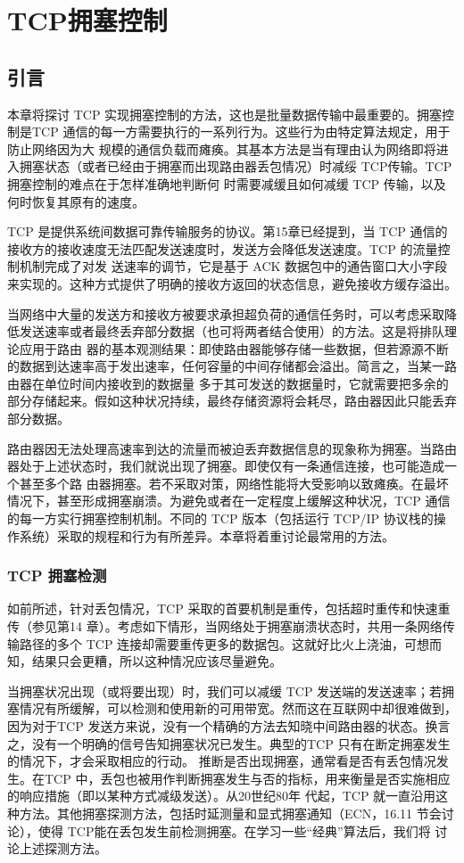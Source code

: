 \chapter{TCP拥塞控制}
\minitoc

\section{引言}
本章将探讨 TCP 实现拥塞控制的方法，这也是批量数据传输中最重要的。拥塞控制是TCP 通信的每一方需要执行的一系列行为。这些行为由特定算法规定，用于防止网络因为大
规模的通信负载而瘫痪。其基本方法是当有理由认为网络即将进入拥塞状态（或者已经由于拥塞而出现路由器丢包情况）时减绥 TCP传输。TCP 拥塞控制的难点在于怎样准确地判断何
时需要减缓且如何减缓 TCP 传输，以及何时恢复其原有的速度。

TCP 是提供系统间数据可靠传输服务的协议。第15章已经提到，当 TCP 通信的接收方的接收速度无法匹配发送速度时，发送方会降低发送速度。TCP 的流量控制机制完成了对发
送速率的调节，它是基于 ACK 数据包中的通告窗口大小字段来实现的。这种方式提供了明确的接收方返回的状态信息，避免接收方缓存溢出。

当网络中大量的发送方和接收方被要求承担超负荷的通信任务时，可以考虑采取降低发送速率或者最终丢弃部分数据（也可将两者结合使用）的方法。这是将排队理论应用于路由
器的基本观测结果：即使路由器能够存储一些数据，但若源源不断的数据到达速率高于发出速率，任何容量的中间存储都会溢出。简言之，当某一路由器在单位时间内接收到的数据量
多于其可发送的数据量时，它就需要把多余的部分存储起来。假如这种状况持续，最终存储资源将会耗尽，路由器因此只能丢弃部分数据。

路由器因无法处理高速率到达的流量而被迫丢弃数据信息的现象称为拥塞。当路由器处于上述状态时，我们就说出现了拥塞。即使仅有一条通信连接，也可能造成一个甚至多个路
由器拥塞。若不采取对策，网络性能将大受影响以致瘫痪。在最坏情况下，甚至形成拥塞崩溃。为避免或者在一定程度上缓解这种状况，TCP 通信的每一方实行拥塞控制机制。不同的
TCP 版本（包括运行 TCP/IP 协议栈的操作系统）采取的规程和行为有所差异。本章将着重讨论最常用的方法。
\subsection{TCP 拥塞检测}
如前所述，针对丢包情况，TCP 采取的首要机制是重传，包括超时重传和快速重传（参见第14 章）。考虑如下情形，当网络处于拥塞崩溃状态时，共用一条网络传输路径的多个
TCP 连接却需要重传更多的数据包。这就好比火上浇油，可想而知，结果只会更糟，所以这种情况应该尽量避免。

当拥塞状况出现（或将要出现）时，我们可以减缓 TCP 发送端的发送速率；若拥塞情况有所缓解，可以检测和使用新的可用带宽。然而这在互联网中却很难做到，因为对于TCP
发送方来说，没有一个精确的方法去知晓中间路由器的状态。换言之，没有一个明确的信号告知拥塞状况已发生。典型的TCP 只有在断定拥塞发生的情况下，才会采取相应的行动。
推断是否出现拥塞，通常看是否有丢包情况发生。在TCP 中，丢包也被用作判断拥塞发生与否的指标，用来衡量是否实施相应的响应措施（即以某种方式减级发送）。从20世纪80年
代起，TCP 就一直沿用这种方法。其他拥塞探测方法，包括时延测量和显式拥塞通知（ECN，16.11 节会讨论），使得 TCP能在丢包发生前检测拥塞。在学习一些“经典”算法后，我们将
讨论上述探测方法。

